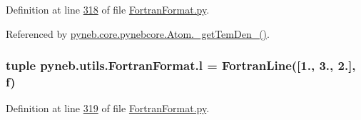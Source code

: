 Definition at line \hyperlink{_fortran_format_8py_source_l00318}{318} of file \hyperlink{_fortran_format_8py_source}{Fortran\-Format.\-py}.



Referenced by \hyperlink{pynebcore_8py_source_l01869}{pyneb.\-core.\-pynebcore.\-Atom.\-\_\-get\-Tem\-Den\-\_()}.

\hypertarget{namespacepyneb_1_1utils_1_1_fortran_format_a80ea829e31363f67a89c70955e194b93}{
\subsubsection[{l}]{\setlength{\rightskip}{0pt plus 5cm}tuple pyneb.\-utils.\-Fortran\-Format.\-l = {\bf Fortran\-Line}(\mbox{[}1., 3., 2.\mbox{]}, {\bf f})}}\label{namespacepyneb_1_1utils_1_1_fortran_format_a80ea829e31363f67a89c70955e194b93}


Definition at line \hyperlink{_fortran_format_8py_source_l00319}{319} of file \hyperlink{_fortran_format_8py_source}{Fortran\-Format.\-py}.

